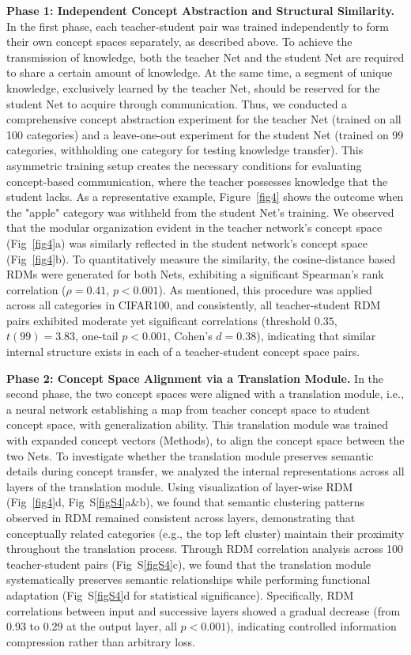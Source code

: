 \documentclass[pdflatex,sn-mathphys-num,lineno]{sn-jnl}%
\begin{document}
\begin{CJK}{UTF8}{gbsn}
\textbf{Phase 1: Independent Concept Abstraction and Structural Similarity.}
In the first phase, each teacher-student pair was trained independently to form their own concept spaces separately, as described above. To achieve the transmission of knowledge, both the teacher Net and the student Net are required to share a certain amount of knowledge. At the same time, a segment of unique knowledge, exclusively learned by the teacher Net, should be reserved for the student Net to acquire through communication. Thus, we conducted a comprehensive concept abstraction experiment for the teacher Net (trained on all 100 categories) and a leave-one-out experiment for the student Net (trained on 99 categories, withholding one category for testing knowledge transfer). This asymmetric training setup creates the necessary conditions for evaluating concept-based communication, where the teacher possesses knowledge that the student lacks. As a representative example, Figure~\ref{fig4} shows the outcome when the "apple" category was withheld from the student Net's training. We observed that the modular organization evident in the teacher network's concept space (Fig~\ref{fig4}a) was similarly reflected in the student network's concept space (Fig~\ref{fig4}b). To quantitatively measure the similarity, the cosine-distance based RDMs were generated for both Nets, exhibiting a significant Spearman’s rank correlation ($\rho=0.41$, $p < 0.001$). As mentioned, this procedure was applied across all categories in CIFAR100, and consistently, all teacher-student RDM pairs exhibited moderate yet significant correlations (threshold $0.35$, $t(99)=3.83$, one-tail $p < 0.001$, Cohen's $d = 0.38$), indicating that similar internal structure exists in each of a teacher-student concept space pairs.

\textbf{Phase 2: Concept Space Alignment via a Translation Module.}
In the second phase, the two concept spaces were aligned with a translation module, i.e., a neural network establishing a map from teacher concept space to student concept space, with generalization ability. This translation module was trained with expanded concept vectors (Methods), to align the concept space between the two Nets. To investigate whether the translation module preserves semantic details during concept transfer, we analyzed the internal representations across all layers of the translation module. Using visualization of layer-wise RDM (Fig~\ref{fig4}d, Fig~S\ref{figS4}a\&b), we found that semantic clustering patterns observed in RDM remained consistent across layers, demonstrating that conceptually related categories (e.g., the top left cluster) maintain their proximity throughout the translation process. Through RDM correlation analysis across 100 teacher-student pairs (Fig~S\ref{figS4}c), we found that the translation module systematically preserves semantic relationships while performing functional adaptation (Fig~S\ref{figS4}d for statistical significance). Specifically, RDM correlations between input and successive layers showed a gradual decrease (from 0.93 to 0.29 at the output layer, all $p < 0.001$), indicating controlled information compression rather than arbitrary loss. 


\end{CJK}
\end{document}

